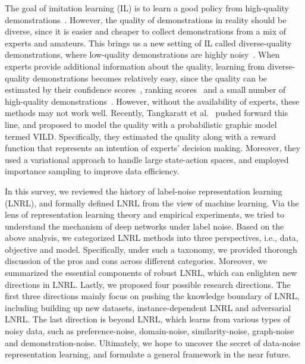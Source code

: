 \begin{itemize}[leftmargin=*]
The goal of imitation learning (IL) is to learn a good policy from high-quality demonstrations~. However, the quality of demonstrations in reality should be diverse, since it is easier and cheaper to collect demonstrations from a mix of experts and amateurs. This brings us a new setting of IL called diverse-quality demonstrations, where low-quality demonstrations are highly noisy~. When experts provide additional information about the quality, learning from diverse-quality demonstrations becomes relatively easy, since the quality can be estimated by their confidence scores~, ranking scores~ and a small number of high-quality demonstrations~. However, without the availability of experts, these methods may not work well. Recently, Tangkaratt et al.~ pushed forward this line, and proposed to model the quality with a probabilistic graphic model termed VILD. Specifically, they estimated the quality along with a reward function that represents an intention of experts' decision making. Moreover, they used a variational approach to handle large state-action spaces, and employed importance sampling to improve  data efficiency.
\end{itemize}

\label{sec:conclusions}
In this survey, 
we reviewed the history of label-noise representation learning (LNRL), 
and formally defined LNRL from the view of machine learning. 
Via the lens of representation learning theory and empirical experiments, we tried to understand the mechanism of deep networks under label noise. Based on the above analysis, 
we categorized LNRL methods into three perspectives, 
i.e., data, objective and model. 
Specifically, 
under such a taxonomy, we provided thorough discussion of the pros and cons across different categories.
Moreover, we summarized the essential components of robust LNRL, which can enlighten new directions in LNRL. 
Lastly, we proposed four possible research directions. The first three directions mainly focus on pushing the knowledge boundary of LNRL, including building up new datasets, instance-dependent LNRL and adversarial LNRL. The last direction is beyond LNRL, which learns from various types of noisy data, such as preference-noise, domain-noise, similarity-noise, graph-noise and demonstration-noise. Ultimately, we hope to uncover the secret of data-noise representation learning, and formulate a general framework in the near future.
